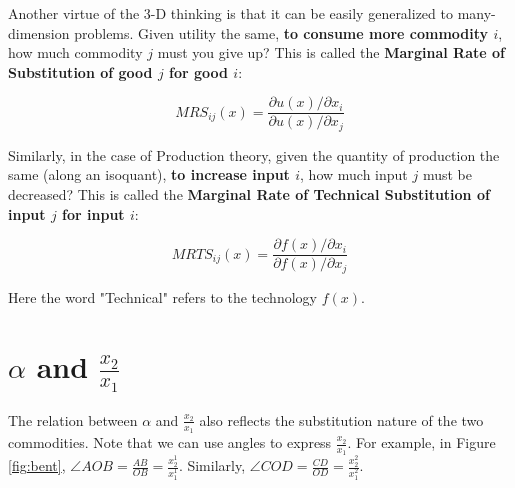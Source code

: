 \documentclass{article}
\begin{document}
\begin{mdframed}[backgroundcolor=blue!20,linecolor=white]
Another virtue of the 3-D thinking is that it can be easily generalized to many-dimension problems. Given utility the same, \textbf{to consume more commodity $i$}, how much commodity $j$ must you give up? This is called the \textbf{Marginal Rate of Substitution of good $j$ for good $i$}:

$$MRS_{ij}(x) = \frac{\partial u(x) / \partial x_i}{\partial u(x) / \partial x_j}$$

Similarly, in the case of Production theory, given the quantity of production the same (along an isoquant), \textbf{to increase input $i$}, how much input $j$ must be decreased? This is called the \textbf{Marginal Rate of Technical Substitution of input $j$ for input $i$}:

$$MRTS_{ij}(x) = \frac{\partial f(x) / \partial x_i}{\partial f(x) / \partial x_j}$$

Here the word "Technical" refers to the technology $f(x)$.

\section{$\alpha$ and $\frac{x_2}{x_1}$}


The relation between $\alpha$ and $\frac{x_2}{x_1}$ also reflects the substitution nature of the two commodities. Note that we can use angles to express $\frac{x_2}{x_1}$. For example, in Figure \ref{fig:bent}, $\angle AOB = \frac{AB}{OB} = \frac{x^1_2}{x^1_1}$. Similarly,  $\angle COD = \frac{CD}{OD} = \frac{x^2_2}{x^2_1}$.

\begin{center}
\end{center}
\end{mdframed}
\end{document}
